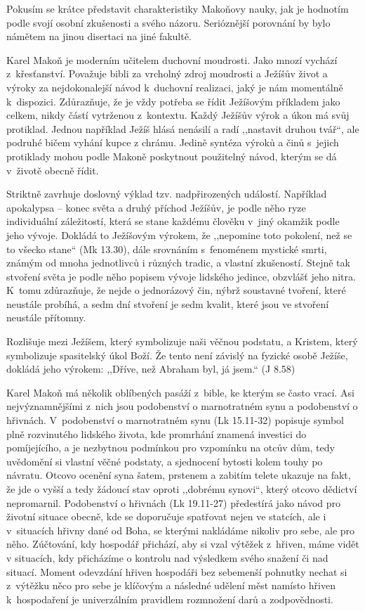 Pokusím se krátce představit charakteristiky Makoňovy nauky,
jak je hodnotím podle svojí osobní zkušenosti a svého
názoru. Serióznější porovnání by bylo námětem na jinou disertaci na jiné
fakultě.

Karel Makoň je moderním učitelem duchovní moudrosti. Jako mnozí vychází z~křesťanství. Považuje bibli za vrcholný zdroj
moudrosti a Ježíšův život a výroky za nejdokonalejší návod k~duchovní realizaci,
jaký je nám momentálně k~dispozici. Zdůrazňuje, že je vždy potřeba se řídit
Ježíšovým příkladem jako celkem, nikdy částí vytrženou z~kontextu. Každý Ježíšův
výrok a úkon má svůj protiklad. Jednou například Ježíš hlásá nenásilí a radí
,,nastavit druhou tvář``, ale podruhé bičem vyhání kupce z chrámu. Jedině syntéza výroků a činů s~jejich protiklady
mohou podle Makoně poskytnout použitelný návod, kterým se dá v~životě obecně
řídit.

Striktně zavrhuje doslovný výklad tzv. nadpřirozených událostí. Například
apokalypsa -- konec světa a druhý příchod Ježíšův, je podle něho ryze individuální záležitostí, která se
stane každému člověku v~jiný okamžik podle jeho vývoje. Dokládá to Ježíšovým
výrokem, že ,,nepomine toto pokolení, než se to všecko stane`` (Mk 13.30), dále
srovnáním s~fenoménem mystické smrti, známým od mnoha jednotlivců i různých
tradic, a vlastní zkušeností. Stejně tak stvoření světa je podle něho popisem
vývoje lidského jedince, obzvlášť jeho nitra. K~tomu zdůrazňuje, že nejde o
jednorázový čin, nýbrž soustavné tvoření, které neustále probíhá, a
sedm dní stvoření je sedm kvalit, které jsou ve stvoření neustále přítomny.

Rozlišuje mezi Ježíšem, který symbolizuje naši věčnou podstatu, a Kristem, který
symbolizuje spasitelský úkol Boží. Že tento není závislý na fyzické osobě Ježíše,
dokládá jeho výrokem: ,,Dříve, než Abraham byl, já jsem.`` (J 8.58)

Karel Makoň má několik oblíbených pasáží z~bible, ke kterým se často vrací. Asi
nejvýznamnějšími z~nich jsou podobenství o marnotratném synu a podobenství o
hřivnách. V~podobenství o marnotratném synu (Lk 15.11-32) popisuje symbol plně rozvinutého
lidského života, kde promrhání znamená investici do pomíjejícího, a je nezbytnou
podmínkou pro vzpomínku na otcův dům, tedy uvědomění si vlastní věčné podstaty, a
sjednocení bytosti kolem touhy po návratu. Otcovo ocenění syna šatem, prstenem a
zabitím telete ukazuje na fakt, že jde o vyšší a tedy žádoucí stav oproti
,,dobrému synovi``, který otcovo dědictví nepromarnil. Podobenství o hřivnách (Lk 19.11-27)
předestírá jako návod pro životní situace obecně, kde se doporučuje spatřovat
nejen ve statcích, ale i v~situacích hřivny dané od Boha, se kterými nakládáme
nikoliv pro sebe, ale pro něho. Zúčtování, kdy hospodář přichází, aby si vzal
výtěžek z~hřiven, máme vidět v situacích, kdy přicházíme o kontrolu nad
výsledkem svého snažení či nad situací. Moment odevzdání hřiven hospodáři bez
sebemenší pohnutky nechat si z~výtěžku něco pro sebe je klíčovým a následné udělení měst
namísto hřiven k~hospodaření je univerzálním pravidlem rozmnožení darů a
zodpovědnosti.

